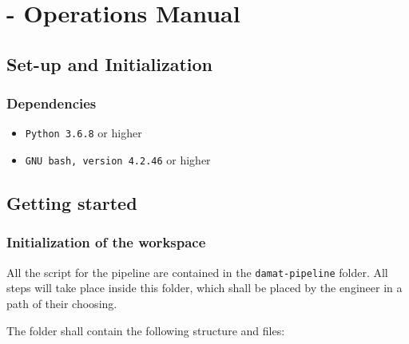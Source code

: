 
\chapter{\DAMA - Operations Manual}

\section{Set-up and Initialization}

\subsection{Dependencies}

\begin{itemize}
	\item \texttt{Python 3.6.8} or higher
	\item \texttt{GNU bash, version 4.2.46} or higher
\end{itemize}

\section{Getting started}

\subsection{Initialization of the \DAMA workspace}

All the script for the \DAMA pipeline are contained in the \texttt{damat-pipeline} folder.
All \DAMA steps will take place inside this folder, which shall be placed by the engineer in a path of their choosing.

The folder shall contain the following structure and files:


